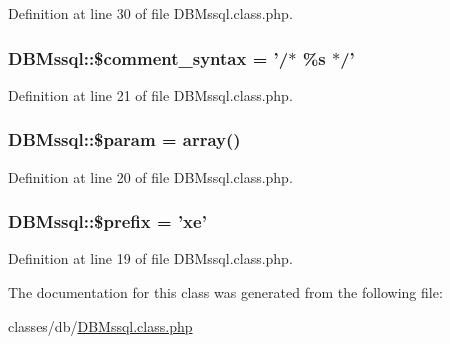 Definition at line 30 of file D\-B\-Mssql.\-class.\-php.

\hypertarget{classDBMssql_ad095d953d508f44a326586a10c95336d}{
\subsubsection[{\$comment\-\_\-syntax}]{\setlength{\rightskip}{0pt plus 5cm}D\-B\-Mssql\-::\$comment\-\_\-syntax = '/$\ast$ \%s $\ast$/'}}\label{classDBMssql_ad095d953d508f44a326586a10c95336d}


Definition at line 21 of file D\-B\-Mssql.\-class.\-php.

\hypertarget{classDBMssql_a352ee40852cea6dc20de096486603805}{
\subsubsection[{\$param}]{\setlength{\rightskip}{0pt plus 5cm}D\-B\-Mssql\-::\$param = array()}}\label{classDBMssql_a352ee40852cea6dc20de096486603805}


Definition at line 20 of file D\-B\-Mssql.\-class.\-php.

\hypertarget{classDBMssql_a733cd192b424b5a66ea14e3e62391844}{
\subsubsection[{\$prefix}]{\setlength{\rightskip}{0pt plus 5cm}D\-B\-Mssql\-::\$prefix = 'xe'}}\label{classDBMssql_a733cd192b424b5a66ea14e3e62391844}


Definition at line 19 of file D\-B\-Mssql.\-class.\-php.



The documentation for this class was generated from the following file\-:\begin{DoxyCompactItemize}
\item 
classes/db/\hyperlink{DBMssql_8class_8php}{D\-B\-Mssql.\-class.\-php}\end{DoxyCompactItemize}
